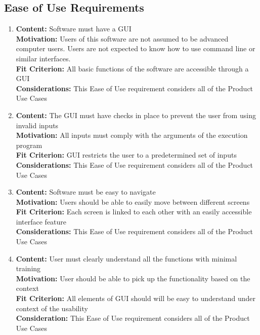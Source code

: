 \documentclass[paper=letter, fontsize=10pt]{scrartcl}
\numberwithin{equation}{section}		%
\numberwithin{figure}{section}			%
\numberwithin{table}{section}				%
\begin{document}
\subsection{Ease of Use Requirements}
\begin{enumerate}
	\item \textbf{Content:} Software must have a GUI
	\\	  \textbf{Motivation:} Users of this software are not assumed to be advanced computer users. Users are not expected to know how to use command line or similar interfaces. 
	\\	  \textbf{Fit Criterion:} All basic functions of the software are accessible through a GUI
	\\	  \textbf{Considerations:} This Ease of Use requirement considers all of the Product Use Cases
	\item \textbf{Content:} The GUI must have checks in place to prevent the user from using invalid inputs 
	\\	  \textbf{Motivation:} All inputs must comply with the arguments of the execution program
	\\	  \textbf{Fit Criterion:} GUI restricts the user to a predetermined set of inputs
	\\	  \textbf{Considerations:} This Ease of Use requirement considers all of the Product Use Cases
	\item \textbf{Content:} Software must be easy to navigate
	\\	  \textbf{Motivation:} Users should be able to easily move between different screens
	\\	  \textbf{Fit Criterion:} Each screen is linked to each other with an easily accessible interface feature
	\\	  \textbf{Considerations:} This Ease of Use requirement considers all of the Product Use Cases
	\item \textbf{Content:} User must clearly understand all the functions with minimal training
	\\	  \textbf{Motivation:} User should be able to pick up the functionality based on the context
	\\	  \textbf{Fit Criterion:} All elements of GUI should will be easy to understand under context of the usability
	\\	  \textbf{Consideration:} This Ease of Use requirement considers all of the Product Use Cases
\end{enumerate}
\end{document}
